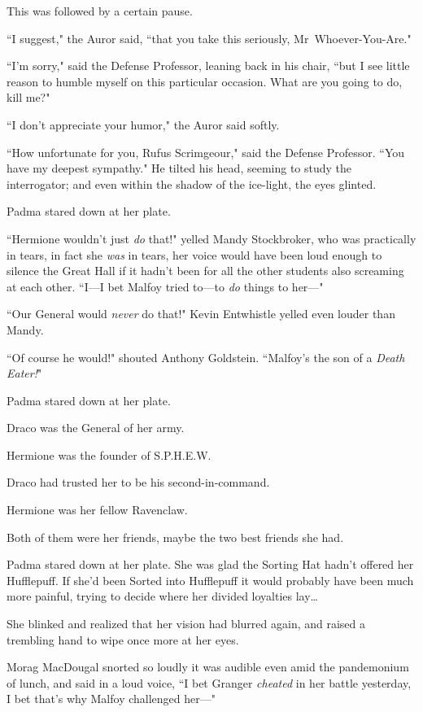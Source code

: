 This was followed by a certain pause.

``I suggest," the Auror said, ``that you take this seriously, Mr~Whoever-You-Are."

``I'm sorry," said the Defense Professor, leaning back in his chair, ``but I see little reason to humble myself on this particular occasion. What are you going to do, kill me?"

``I don't appreciate your humor," the Auror said softly.

``How unfortunate for you, Rufus Scrimgeour," said the Defense Professor. ``You have my deepest sympathy." He tilted his head, seeming to study the interrogator; and even within the shadow of the ice-light, the eyes glinted.

\later

Padma stared down at her plate.

``Hermione wouldn't just \emph{do} that!" yelled Mandy Stockbroker, who was practically in tears, in fact she \emph{was} in tears, her voice would have been loud enough to silence the Great Hall if it hadn't been for all the other students also screaming at each other. ``I—I bet Malfoy tried to—to \emph{do} things to her—"

``Our General would \emph{never} do that!" Kevin Entwhistle yelled even louder than Mandy.

``Of course he would!" shouted Anthony Goldstein. ``Malfoy's the son of a \emph{Death Eater!}"

Padma stared down at her plate.

Draco was the General of her army.

Hermione was the founder of S.P.H.E.W.

Draco had trusted her to be his second-in-command.

Hermione was her fellow Ravenclaw.

Both of them were her friends, maybe the two best friends she had.

Padma stared down at her plate. She was glad the Sorting Hat hadn't offered her Hufflepuff. If she'd been Sorted into Hufflepuff it would probably have been much more painful, trying to decide where her divided loyalties lay{\ldots}

She blinked and realized that her vision had blurred again, and raised a trembling hand to wipe once more at her eyes.

Morag MacDougal snorted so loudly it was audible even amid the pandemonium of lunch, and said in a loud voice, ``I bet Granger \emph{cheated} in her battle yesterday, I bet that's why Malfoy challenged her—"

